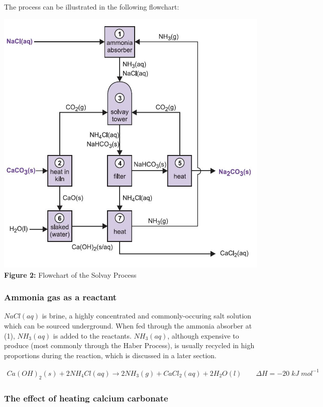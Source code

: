 \documentclass[12pt, a4paper]{article}
\begin{document}
The process can be illustrated in the following flowchart:

\begin{center}
\includegraphics[scale=0.6]{solvay.jpeg}
\\
\textbf{Figure 2:} Flowchart of the Solvay Process
\end{center}




\subsubsection{Ammonia gas as a reactant}

\(NaCl(aq)\) is brine, a highly concentrated and commonly-occuring salt solution which can be sourced underground. When fed through the ammonia absorber at (1),  \(NH_{3}(aq)\) is added to the reactants. \(NH_{3}(aq)\), although expensive to produce (most commonly through the Haber Process), is usually recycled in high proportions during the reaction, which is discussed in a later section.


\begin{align}
	Ca(OH)_{2}(s) + 2NH_{4}Cl(aq) \rightarrow 2NH_{3}(g) + CaCl_{2}(aq) + 2H_{2}O(l) \qquad \Delta H = -20 \; kJ \; mol^{-1}
\end{align}


\subsubsection{The effect of heating calcium carbonate}
\end{document}
